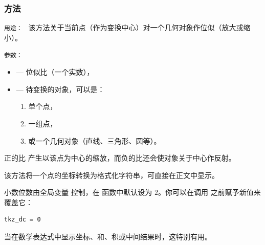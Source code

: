 \subsubsection{方法 }
\label{ssub:method_point_homothety_k_obj}

\texttt{用途： } 该方法关于当前点（作为变换中心）对一个几何对象作位似（放大或缩小）。

\medskip

\texttt{参数： }
\begin{itemize}
  \item {} — 位似比（一个实数），
  \item {} — 待变换的对象，可以是：
  \begin{enumerate}
    \item 单个点，
    \item 一组点，
    \item 或一个几何对象（直线、三角形、圆等）。
  \end{enumerate}
\end{itemize}


正的比  产生以该点为中心的缩放，而负的比还会使对象关于中心作反射。

\vspace{1em}

\begin{tkzexample}[latex=7cm]
\begin{center}
\end{center}
\end{tkzexample}

 该方法将一个点的坐标转换为格式化字符串，可直接在正文中显示。

\medskip

小数位数由全局变量  控制，在  函数中默认设为 $2$。你可以在调用  之前赋予新值来覆盖它：

\begin{verbatim}
tkz_dc = 0
\end{verbatim}

\medskip

当在数学表达式中显示坐标、和、积或中间结果时，这特别有用。

